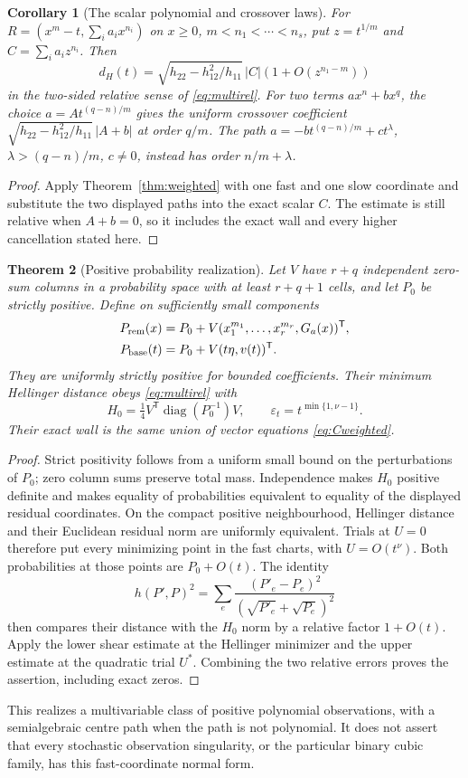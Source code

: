 \documentclass[11pt,reqno]{amsart}
\numberwithin{equation}{section}
\newtheorem{theorem}{Theorem}[section]
\newtheorem{corollary}[theorem]{Corollary}
\theoremstyle{definition}
\theoremstyle{remark}
\newcommand{\eps}{\varepsilon}
\begin{document}
\begin{corollary}[The scalar polynomial and crossover laws]\label{cor:scalar}
For $R=(x^m-t,\sum_i a_ix^{n_i})$ on $x\ge0$, $m<n_1<\cdots<n_s$, put $z=t^{1/m}$ and $C=\sum_i a_i z^{n_i}$. Then
\[
 d_H(t)=\sqrt{h_{22}-h_{12}^2/h_{11}}\,|C|
                 (1+O(z^{n_1-m}))
\]
in the two-sided relative sense of \eqref{eq:multirel}. For two terms $a x^n+b x^q$, the choice $a=A t^{(q-n)/m}$ gives the uniform crossover coefficient $\sqrt{h_{22}-h_{12}^2/h_{11}}\,|A+b|$ at order $q/m$. The path
$a=-b t^{(q-n)/m}+c t^\lambda$, $\lambda>(q-n)/m$, $c\ne0$, instead has order $n/m+\lambda$.
\end{corollary}
\begin{proof}
Apply Theorem~\ref{thm:weighted} with one fast and one slow coordinate and substitute the two displayed paths into the exact scalar $C$. The estimate is still relative when $A+b=0$, so it includes the exact wall and every higher cancellation stated here.
\end{proof}

\begin{theorem}[Positive probability realization]\label{thm:hellinger}
Let $V$ have $r+q$ independent zero-sum columns in a probability space with at least $r+q+1$ cells, and let $P_0$ be strictly positive. Define on sufficiently small components
\begin{align*}
 P_{\rm rem}(x)&=P_0+V(x_1^{m_1},\ldots,x_r^{m_r},G_a(x))^{\mathsf T},\\
 P_{\rm base}(t)&=P_0+V(t\eta,v(t))^{\mathsf T}.
\end{align*}
They are uniformly strictly positive for bounded coefficients. Their minimum Hellinger distance obeys \eqref{eq:multirel} with
\[
 H_0=\tfrac14 V^{\mathsf T}\operatorname{diag}(P_0^{-1})V,
 \qquad \eps_t=t^{\min\{1,\nu-1\}}.
\]
Their exact wall is the same union of vector equations \eqref{eq:Cweighted}.
\end{theorem}
\begin{proof}
Strict positivity follows from a uniform small bound on the perturbations of $P_0$; zero column sums preserve total mass. Independence makes $H_0$ positive definite and makes equality of probabilities equivalent to equality of the displayed residual coordinates. On the compact positive neighbourhood, Hellinger distance and their Euclidean residual norm are uniformly equivalent. Trials at $U=0$ therefore put every minimizing point in the fast charts, with $U=O(t^\nu)$. Both probabilities at those points are $P_0+O(t)$. The identity
\[
 h(P',P)^2=\sum_e\frac{(P'_e-P_e)^2}{(\sqrt{P'_e}+\sqrt{P_e})^2}
\]
then compares their distance with the $H_0$ norm by a relative factor $1+O(t)$. Apply the lower shear estimate at the Hellinger minimizer and the upper estimate at the quadratic trial $U^*$. Combining the two relative errors proves the assertion, including exact zeros.
\end{proof}
This realizes a multivariable class of positive polynomial observations, with a semialgebraic centre path when the path is not polynomial. It does not assert that every stochastic observation singularity, or the particular binary cubic family, has this fast-coordinate normal form.
\end{document}
